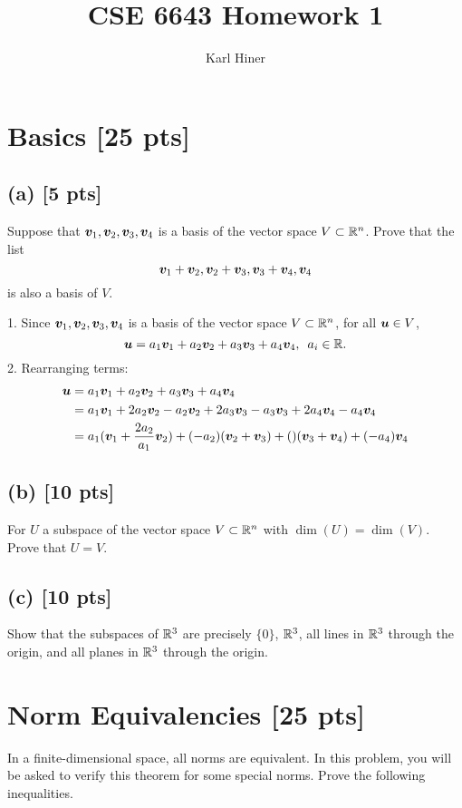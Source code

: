 \documentclass[twoside,10pt]{article}
\newcommand{\eqn}[1]{\begin{equation*}#1\end{equation*}}
\newcommand{\aln}[1]{\begin{align}#1\end{align}}
\newcommand{\s}{\enspace}
\begin{document}
\title{CSE 6643 Homework 1}
\author{Karl Hiner}
\date{}
\maketitle

\section{Basics [25 pts]}

\subsection*{(a) [5 pts]}
Suppose that $\bm{v}_1, \bm{v}_2, \bm{v}_3, \bm{v}_4$ is a basis of the vector space $V \subset \mathbb{R}^n$. Prove that the list 
\begin{equation}
  \bm{v}_1 + \bm{v}_2, \bm{v}_2 + \bm{v}_3, \bm{v}_3 + \bm{v}_4, \bm{v}_4
\end{equation}
is also a basis of $V$.

1. Since $\bm{v}_1, \bm{v}_2, \bm{v}_3, \bm{v}_4$ is a basis of the vector space $V \subset \mathbb{R}^n$, for all $\bm{u} \in V$,
\eqn{\vct{u} = a_1\vct{v}_1 + a_2\vct{v}_2 + a_3\vct{v}_3 + a_4\vct{v}_4, \s a_i \in \R.}
2. Rearranging terms:
\aln{
  \vct{u} &= a_1\vct{v}_1 + a_2\vct{v}_2 + a_3\vct{v}_3 + a_4\vct{v}_4\\
  &= a_1\vct{v}_1 + 2a_2\vct{v}_2 - a_2\vct{v}_2 + 2a_3\vct{v}_3 - a_3\vct{v}_3 + 2a_4\vct{v}_4 - a_4\vct{v}_4\\
  &= a_1(\vct{v}_1 + \frac{2a_2}{a_1}\vct{v}_2) + (-a_2)(\vct{v}_2 + \vct{v}_3) + ()(\vct{v}_3 + \vct{v}_4) + (-a_4)\vct{v}_4\\
}

\subsection*{(b) [10 pts]}
For $U$ a subspace of the vector space $V \subset \mathbb{R}^n$ with $\dim(U) = \dim(V)$. Prove that $U = V$.

\subsection*{(c) [10 pts]}
Show that the subspaces of $\mathbb{R}^3$ are precisely $\{0\}$, $\mathbb{R}^{3}$, all lines in $\mathbb{R}^3$ through the origin, and all planes in $\mathbb{R}^3$ through the origin.

\section{Norm Equivalencies [25 pts]}
In a finite-dimensional space, all norms are equivalent. In this problem, you will be asked to verify this theorem for some special norms. Prove the following inequalities. 
\end{document}
